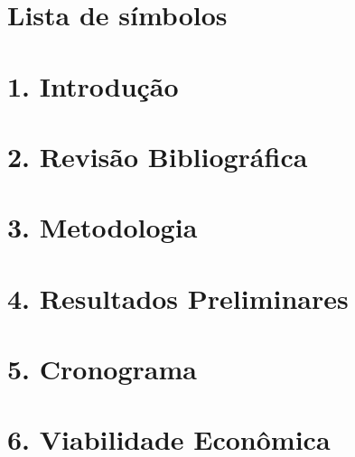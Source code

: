 \documentclass[12pt, a4paper]{report}
\begin{document}
\capa

\folhaderosto
\folhadeaprovacao

\dedicatoria{}
\agradecimentos{}
\epigrafe{}
\resumo{}
\resumolinguaestrangeira{}
\listadefiguras
\listadetabelas
\listadeabreviaturasesiglas

\chapter*{Lista de símbolos}




\sumario

\onehalfspacing		%

\pagestyle{myheadings}


\setcounter{page}{14}
\chapter[Introdução]{1. Introdução}


\chapter[Revisão Bibliográfica]{2. Revisão Bibliográfica}


\chapter[Metodologia]{3. Metodologia}


\chapter[Resultados Preliminares]{4. Resultados Preliminares}


\chapter[Cronograma]{5. Cronograma}


\chapter[Viabilidade Econômica]{6. Viabilidade Econômica}

\end{document}
